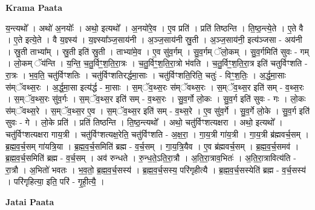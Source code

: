 \documentclass[17pt]{extarticle}
\begin{document}
\textbf{Krama Paata} \newline

य॒न्त्यथो᳚ । अथो॑ अ॒नयोः᳚ । अथो॒ इत्यथो᳚ । अ॒नयो॑रे॒व । ए॒व प्रति॑ । प्रति॑ तिष्ठन्ति । ति॒ष्ठ॒न्त्ये॒ते । ए॒ते वै । ए॒ते इत्ये॒ते । वै य॒ज्ञ्स्य॑ । य॒ज्ञ्स्या᳚ञ्ज॒साय॑नी । अ॒ञ्ज॒साय॑नी स्रु॒ती । अ॒ञ्ज॒साय॑नी॒ इत्य॑ञ्जसा - अय॑नी । स्रु॒ती ताभ्या᳚म् । स्रु॒ती इति॑ स्रु॒ती । ताभ्या॑मे॒व । ए॒व सु॑व॒र्गम् । सु॒व॒र्गम् ॅलो॒कम् । सु॒व॒र्गमिति॑ सुवः - गम् । लो॒कम् ॅय॑न्ति । य॒न्ति॒ च॒तु॒र्विꣳ॒॒श॒ति॒रा॒त्रः । च॒तु॒र्विꣳ॒॒श॒ति॒रा॒त्रो भ॑वति । च॒तु॒र्विꣳ॒॒श॒ति॒रा॒त्र इति॑ चतुर्विꣳशति - रा॒त्रः । भ॒व॒ति॒ चतु॑र्विꣳशतिः । चतु॑र्विꣳशतिरर्द्धमा॒साः । चतु॑र्विꣳशति॒रिति॒ चतुः॑ - विꣳ॒॒श॒तिः॒ । अ॒र्द्ध॒मा॒साः स॑म्ॅवथ्स॒रः । अ॒र्द्ध॒मा॒सा इत्य॑र्द्ध - मा॒साः । स॒म्ॅव॒थ्स॒रः स॑म्ॅवथ्स॒रः । स॒म्ॅव॒थ्स॒र इति॑ सम् - व॒थ्स॒रः । स॒म्ॅव॒थ्स॒रः सु॑व॒र्गः । स॒म्ॅव॒थ्स॒र इति॑ सम् - व॒थ्स॒रः । सु॒व॒र्गो लो॒कः । सु॒व॒र्ग इति॑ सुवः - गः । लो॒कः स॑म्ॅवथ्स॒रे । स॒म्ॅव॒थ्स॒र ए॒व । स॒म्ॅव॒थ्स॒र इति॑ सम् - व॒थ्स॒रे । ए॒व सु॑व॒र्गे । सु॒व॒र्गे लो॒के । सु॒व॒र्ग इति॑ सुवः - गे । लो॒के प्रति॑ । प्रति॑ तिष्ठन्ति । ति॒ष्ठ॒न्त्यथो᳚ । अथो॒ चतु॑र्विꣳशत्यक्षरा । अथो॒ इत्यथो᳚ । चतु॑र्विꣳशत्यक्षरा गाय॒त्री । चतु॑र्विꣳशत्यक्ष॒रेति॒ चतु॑र्विꣳशति - अ॒क्ष॒रा॒ । गा॒य॒त्री गा॑य॒त्री । गा॒य॒त्री ब्र॑ह्मवर्च॒सम् । ब्र॒ह्म॒व॒र्च॒सम् गा॑यत्रि॒या । ब्र॒ह्म॒व॒र्च॒समिति॑ ब्रह्म - व॒र्च॒सम् । गा॒य॒त्रि॒यैव । ए॒व ब्र॑ह्मवर्च॒सम् । ब्र॒ह्म॒व॒र्च॒समव॑ । ब्र॒ह्म॒व॒र्च॒समिति॑ ब्रह्म - व॒र्च॒सम् । अव॑ रुन्धते । रु॒न्ध॒ते॒ऽति॒रा॒त्रौ । अ॒ति॒रा॒त्राव॒भितः॑ । अ॒ति॒रा॒त्रावित्य॑ति - रा॒त्रौ । अ॒भितो॑ भवतः । भ॒व॒तो॒ ब्र॒ह्म॒व॒र्च॒सस्य॑ । ब्र॒ह्म॒व॒र्च॒सस्य॒ परि॑गृहीत्यै । ब्र॒ह्म॒व॒र्च॒सस्येति॑ ब्रह्म - व॒र्च॒सस्य॑ । परि॑गृहित्या॒ इति॒ परि॑ - गृ॒ही॒त्यै॒ । \newline

\textbf{Jatai Paata} \newline
\end{document}

